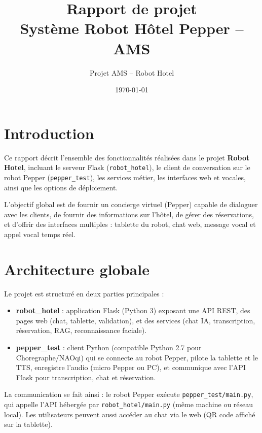 \documentclass[12pt,a4paper]{article}
\title{\textbf{Rapport de projet} \\[0.5em] \large Système Robot Hôtel Pepper -- AMS}
\author{Projet AMS -- Robot Hotel}
\date{\today}
\begin{document}
\maketitle
\tableofcontents
\newpage

\section{Introduction}

Ce rapport décrit l'ensemble des fonctionnalités réalisées dans le projet \textbf{Robot Hotel}, incluant le serveur Flask (\texttt{robot\_hotel}), le client de conversation sur le robot Pepper (\texttt{pepper\_test}), les services métier, les interfaces web et vocales, ainsi que les options de déploiement.

L'objectif global est de fournir un concierge virtuel (Pepper) capable de dialoguer avec les clients, de fournir des informations sur l'hôtel, de gérer des réservations, et d'offrir des interfaces multiples : tablette du robot, chat web, message vocal et appel vocal temps réel.

\section{Architecture globale}

Le projet est structuré en deux parties principales :

\begin{itemize}[noitemsep]
  \item \textbf{robot\_hotel} : application Flask (Python 3) exposant une API REST, des pages web (chat, tablette, validation), et des services (chat IA, transcription, réservation, RAG, reconnaissance faciale).
  \item \textbf{pepper\_test} : client Python (compatible Python 2.7 pour Choregraphe/NAOqi) qui se connecte au robot Pepper, pilote la tablette et le TTS, enregistre l'audio (micro Pepper ou PC), et communique avec l'API Flask pour transcription, chat et réservation.
\end{itemize}

La communication se fait ainsi : le robot Pepper exécute \texttt{pepper\_test/main.py}, qui appelle l'API hébergée par \texttt{robot\_hotel/main.py} (même machine ou réseau local). Les utilisateurs peuvent aussi accéder au chat via le web (QR code affiché sur la tablette).
\end{document}

